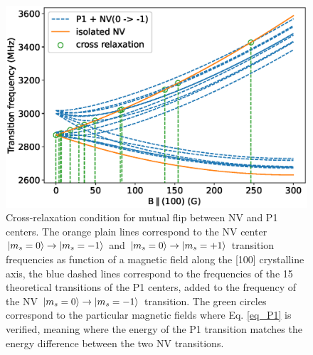 \documentclass[9pt,twocolumn,twoside]{revtex4-1}
\begin{document}
\begin{figure}
\includegraphics[width=\linewidth]{Transis_P1}
\caption{Cross-relaxation condition for mutual flip between NV and P1 centers. The orange plain lines correspond to the NV center $\ket{m_s=0} \to \ket{m_s=-1}$ and $\ket{m_s=0} \to \ket{m_s=+1}$ transition frequencies as function of a magnetic field along the [100] crystalline axis, the blue dashed lines correspond to the frequencies of the 15 theoretical transitions of the P1 centers, added to the frequency of the NV $\ket{m_s=0} \to \ket{m_s=-1}$ transition. The green circles correspond to the particular magnetic fields where Eq. \ref{eq_P1} is verified, meaning where the energy of the P1 transition matches the energy difference between the two NV transitions.}\label{fig_P1}
\end{figure}

\end{document}
